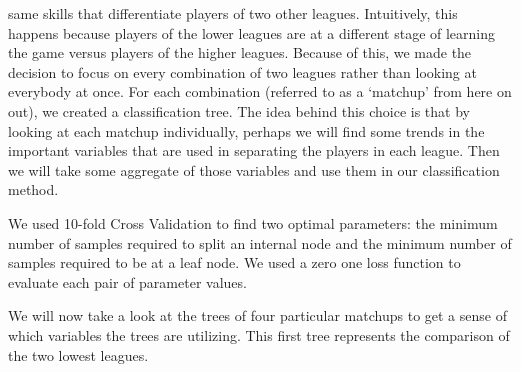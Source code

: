 \documentclass[letterpaper,10pt,english]{/usr/share/sphinx/texinputs/sphinxhowto}
\begin{document}
same skills that differentiate players of two other leagues.
Intuitively, this happens because players of the lower leagues are at a
different stage of learning the game versus players of the higher
leagues. Because of this, we made the decision to focus on every
combination of two leagues rather than looking at everybody at once. For
each combination (referred to as a `matchup' from here on out), we
created a classification tree. The idea behind this choice is that by
looking at each matchup individually, perhaps we will find some trends
in the important variables that are used in separating the players in
each league. Then we will take some aggregate of those variables and use
them in our classification method.

We used 10-fold Cross Validation to find two optimal parameters: the
minimum number of samples required to split an internal node and the
minimum number of samples required to be at a leaf node. We used a zero
one loss function to evaluate each pair of parameter values.

We will now take a look at the trees of four particular matchups to get
a sense of which variables the trees are utilizing.  This first tree represents the comparison of the two lowest leagues.

    

        
        

            
\end{document}
